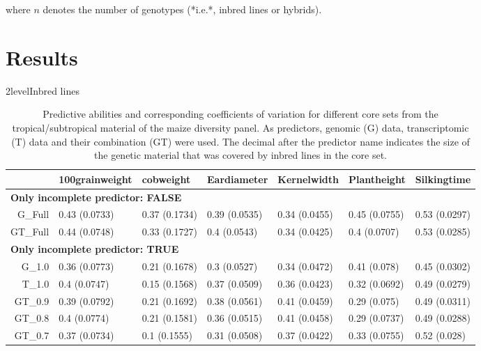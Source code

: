 \documentclass[12pt,titlepage]{article}
\begin{document}
where $n$ denotes the number of genotypes (*i.e.*, inbred lines or hybrids).












\section*{Results}
\Genetics2level{Inbred lines}


\begin{table}[ht]
\label{tbl:InbredTable}
\centering
\caption{Predictive abilities and corresponding coefficients of variation for different core sets from the tropical/subtropical material of the maize diversity panel. As predictors, genomic (G) data, transcriptomic (T) data and their combination (GT) were used. The decimal after the predictor name indicates the size of the genetic material that was covered by inbred lines in the core set.} 
\begin{tabular}{rllllll}
  \toprule
 & 100grainweight & cobweight & Eardiameter & Kernelwidth & Plantheight & Silkingtime \\ 
  \midrule
\multicolumn{6}{l}{{\bfseries Only incomplete predictor: FALSE}}\\
G\_Full & 0.43 (0.0733) & 0.37 (0.1734) & 0.39 (0.0535) & 0.34 (0.0455) & 0.45 (0.0755) & 0.53 (0.0297) \\ 
  GT\_Full & 0.44 (0.0748) & 0.33 (0.1727) & 0.4 (0.0543) & 0.34 (0.0425) & 0.4 (0.0707) & 0.53 (0.0285) \\ 
   \midrule
\multicolumn{6}{l}{{\bfseries Only incomplete predictor: TRUE}}\\
G\_1.0 & 0.36 (0.0773) & 0.21 (0.1678) & 0.3 (0.0527) & 0.34 (0.0472) & 0.41 (0.078) & 0.45 (0.0302) \\ 
  T\_1.0 & 0.4 (0.0747) & 0.15 (0.1568) & 0.37 (0.0509) & 0.36 (0.0423) & 0.32 (0.0692) & 0.49 (0.0279) \\ 
  GT\_0.9 & 0.39 (0.0792) & 0.21 (0.1692) & 0.38 (0.0561) & 0.41 (0.0459) & 0.29 (0.075) & 0.49 (0.0311) \\ 
  GT\_0.8 & 0.4 (0.0774) & 0.21 (0.1581) & 0.36 (0.0515) & 0.41 (0.0458) & 0.29 (0.0737) & 0.49 (0.0288) \\ 
  GT\_0.7 & 0.37 (0.0734) & 0.1 (0.1555) & 0.31 (0.0508) & 0.37 (0.0422) & 0.33 (0.0755) & 0.52 (0.028) \\ 

\end{tabular}
\end{table}
\end{document}
